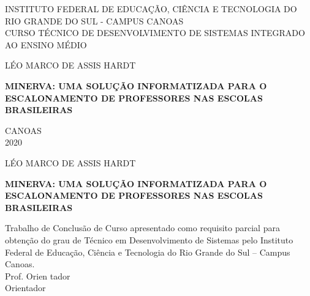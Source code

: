 \documentclass[12pt,a4paper]{article}
\newenvironment{bottompar}{\par\vspace*{\fill}}{\clearpage}
\begin{document}
	\thispagestyle{empty}

	\begin{center}
		INSTITUTO FEDERAL DE EDUCAÇÃO, CIÊNCIA E TECNOLOGIA DO RIO GRANDE DO SUL - CAMPUS CANOAS \\
		CURSO TÉCNICO DE DESENVOLVIMENTO DE SISTEMAS INTEGRADO AO ENSINO MÉDIO\\
	\end{center}

	\vskip 3cm

	\begin{center}
		LÉO MARCO DE ASSIS HARDT
	\end{center}

	\vskip 5cm

	\begin{center}
		\textbf{MINERVA: UMA SOLUÇÃO INFORMATIZADA PARA O ESCALONAMENTO DE PROFESSORES NAS ESCOLAS BRASILEIRAS}
	\end{center}


	\begin{bottompar}
		\begin{center}
		CANOAS \\
		2020
		\end{center}
	\end{bottompar}

	\thispagestyle{empty}

	\begin{center}
		LÉO MARCO DE ASSIS HARDT
	\end{center}

	\vskip 3cm


	\begin{center}
		\textbf{MINERVA: UMA SOLUÇÃO INFORMATIZADA PARA O ESCALONAMENTO DE PROFESSORES NAS ESCOLAS BRASILEIRAS}
	\end{center}

	\vskip 2cm

	\begin{addmargin}[7.5cm]{0em}

		\setlength{\parindent}{0mm}
		Trabalho de Conclusão de Curso apresentado como requisito parcial para obtenção do grau de Técnico em Desenvolvimento de Sistemas pelo Instituto Federal de Educação, Ciência e Tecnologia do Rio Grande do Sul – Campus Canoas.\\

		Prof. Orien tador\\
		Orientador

	\end{addmargin}
\end{document}
